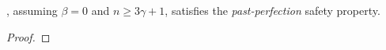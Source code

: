 \begin{lemma}\label{lem:pod-pp-safety-crash}
	, assuming $\beta = 0$ and $n \geq 3 \gamma + 1$, satisfies the \emph{past-perfection} safety property.
\end{lemma}
\begin{proof}



\end{proof}
